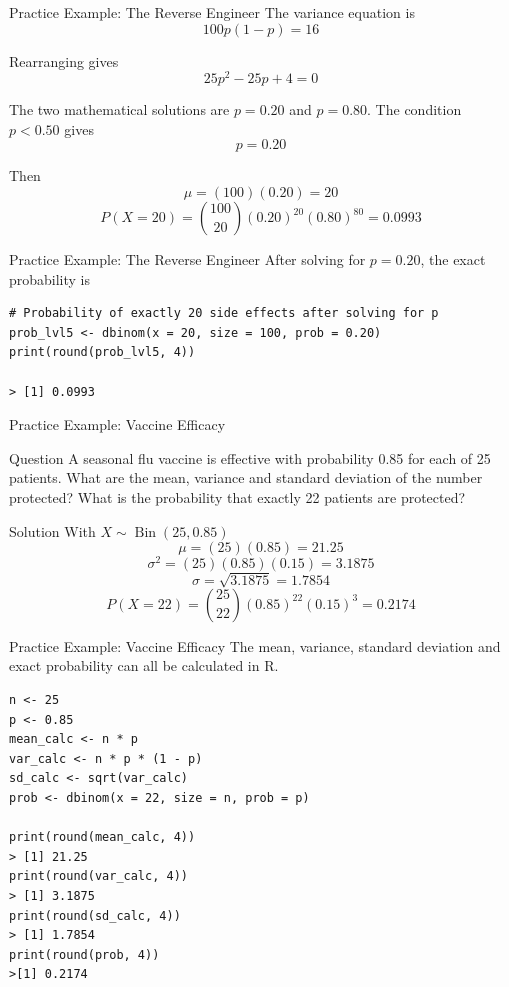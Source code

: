 \documentclass[aspectratio=169]{beamer}
\begin{document}
\begin{frame}{Practice Example: The Reverse Engineer}
The variance equation is
$$100p(1-p)=16$$

Rearranging gives
$$25p^2-25p+4=0$$

The two mathematical solutions are $p=0.20$ and $p=0.80$. The condition $p<0.50$ gives
$$p=0.20$$

Then
$$\mu=(100)(0.20)=20$$
$$P(X=20)=\binom{100}{20}(0.20)^{20}(0.80)^{80}=0.0993$$
\end{frame}

\begin{frame}[fragile]{Practice Example: The Reverse Engineer}
After solving for $p=0.20$, the exact probability is

\begin{verbatim}
# Probability of exactly 20 side effects after solving for p
prob_lvl5 <- dbinom(x = 20, size = 100, prob = 0.20)
print(round(prob_lvl5, 4))

> [1] 0.0993
\end{verbatim}
\end{frame}

\begin{frame}{Practice Example: Vaccine Efficacy}
\begin{block}{Question}
A seasonal flu vaccine is effective with probability 0.85 for each of 25 patients. What are the mean, variance and standard deviation of the number protected? What is the probability that exactly 22 patients are protected?
\end{block}
\pause
\begin{block}{Solution}
With $X \sim \operatorname{Bin}(25,0.85)$
$$\mu=(25)(0.85)=21.25$$
$$\sigma^2=(25)(0.85)(0.15)=3.1875$$
$$\sigma=\sqrt{3.1875}=1.7854$$
$$P(X=22)=\binom{25}{22}(0.85)^{22}(0.15)^3=0.2174$$
\end{block}
\end{frame}

\begin{frame}[fragile]{Practice Example: Vaccine Efficacy}
The mean, variance, standard deviation and exact probability can all be calculated in R.

\scriptsize
\begin{verbatim}
n <- 25
p <- 0.85
mean_calc <- n * p
var_calc <- n * p * (1 - p)
sd_calc <- sqrt(var_calc)
prob <- dbinom(x = 22, size = n, prob = p)

print(round(mean_calc, 4))
> [1] 21.25
print(round(var_calc, 4))
> [1] 3.1875
print(round(sd_calc, 4))
> [1] 1.7854
print(round(prob, 4))
>[1] 0.2174
\end{verbatim}
\normalsize
\end{frame}
\end{document}
